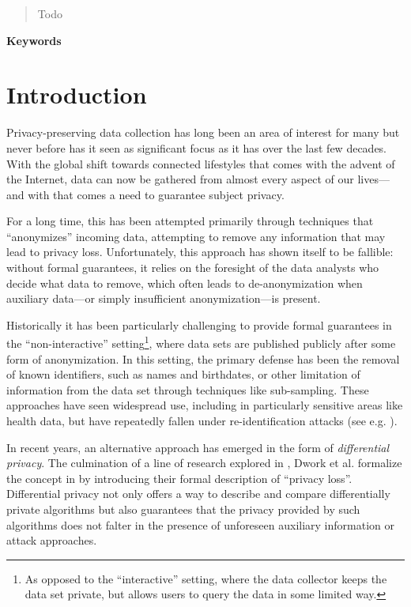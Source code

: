 \documentclass[12pt]{article}
\newcommand{\todo}[1]{{\color{red}#1}}
\begin{document}


\renewcommand{\abstractname}{Abstract}
\begin{abstract}
\todo{Todo}
\end{abstract}

\begin{center} \bf Keywords \end{center}

\thispagestyle{empty}
\tableofcontents
\newpage

\section{Introduction}

Privacy-preserving data collection has long been an area of interest for many but never before has it seen as significant focus as it has over the last few decades. With the global shift towards connected lifestyles that comes with the advent of the Internet, data can now be gathered from almost every aspect of our lives---and with that comes a need to guarantee subject privacy.

For a long time, this has been attempted primarily through techniques that ``anonymizes'' incoming data, attempting to remove any information that may lead to privacy loss. Unfortunately, this approach has shown itself to be fallible: without formal guarantees, it relies on the foresight of the data analysts who decide what data to remove, which often leads to de-anonymization when auxiliary data---or simply insufficient anonymization---is present.

\bigskip

Historically it has been particularly challenging to provide formal guarantees in the ``non-interactive'' setting\footnote{As opposed to the ``interactive'' setting, where the data collector keeps the data set private, but allows users to query the data in some limited way.}, where data sets are published publicly after some form of anonymization. In this setting, the primary defense has been the removal of known identifiers, such as names and birthdates, or other limitation of information from the data set through techniques like sub-sampling. These approaches have seen widespread use, including in particularly sensitive areas like health data, but have repeatedly fallen under re-identification attacks (see e.g. \cite{reidentification2011}).

In recent years, an alternative approach has emerged in the form of \emph{differential privacy}. The culmination of a line of research explored in \cite{precursor_2003,precursor_2004,precusor_2005}, Dwork et al. formalize the concept in \cite{dworketal2006} by introducing their formal description of ``privacy loss''. Differential privacy not only offers a way to describe and compare differentially private algorithms but also guarantees that the privacy provided by such algorithms does not falter in the presence of unforeseen auxiliary information or attack approaches.
\end{document}
